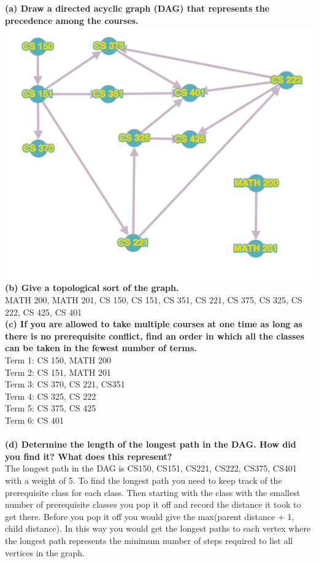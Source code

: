 \documentclass{article}
\begin{document}
\noindent \textbf{(a) Draw a directed acyclic graph (DAG) that represents the precedence among the courses.}
\\[.25cm]
\includegraphics[scale=.75]{DAG}\\
\textbf{(b) Give a topological sort of the graph.}
\\[.25cm]
MATH 200, MATH 201, CS 150, CS 151, CS 351, CS 221, CS 375, CS 325, CS 222, CS 425, CS 401
\\[.25cm]
\textbf{(c) If you are allowed to take multiple courses at one time as long as there is no prerequisite conflict, find an order in which all the classes can be taken in the fewest number of terms.}
\\[.25cm]
Term 1: CS 150, MATH 200\\
Term 2: CS 151, MATH 201\\
Term 3: CS 370, CS 221, CS351\\
Term 4: CS 325, CS 222\\
Term 5: CS 375, CS 425\\
Term 6: CS 401\\
\\[.25cm]
\textbf{(d) Determine the length of the longest path in the DAG. How did you find it? What does this represent?}
\\[.25cm]
The longest path in the DAG is CS150, CS151, CS221, CS222, CS375, CS401 with a weight of 5. To find the longest path you need to keep track of the prerequisite class for each class. Then starting with the class with the smallest number of prerequisite classes you pop it off and record the distance it took to get there. Before you pop it off you would give the max(parent distance + 1, child distance). In this way you would get the longest paths to each vertex where the longest path represents the minimum number of steps required to list all vertices in the graph. 
\\[.25cm]
\end{document}
